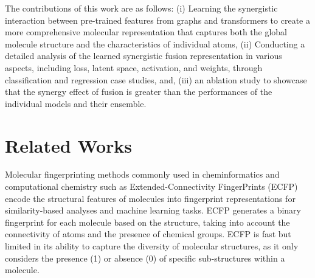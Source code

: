 \documentclass[sigconf,nonacm]{acmart}
\begin{document}
The contributions of this work are as follows: (i) Learning the synergistic interaction between pre-trained features from graphs and transformers to create a more comprehensive molecular representation that captures both the global molecule structure and the characteristics of individual atoms, (ii) Conducting a detailed analysis of the learned synergistic fusion representation in various aspects, including loss, latent space, activation, and weights, through classification and regression case studies, and, (iii) an ablation study to showcase that the synergy effect of fusion is greater than the performances of the individual models and their ensemble.









\section{Related Works}
Molecular fingerprinting methods commonly used in cheminformatics and computational chemistry such as Extended-Connectivity FingerPrints (ECFP) \cite{doi:10.1021/ci100050t} encode the structural features of molecules into fingerprint representations for similarity-based analyses and machine learning tasks. ECFP generates a binary fingerprint for each molecule based on the structure, taking into account the connectivity of atoms and the presence of chemical groups. ECFP is fast but limited in its ability to capture the diversity of molecular structures, as it only considers the presence (1) or absence (0) of specific sub-structures within a molecule.
\end{document}
